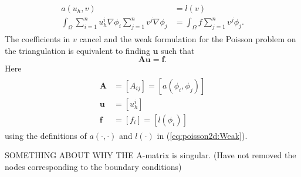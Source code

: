 \documentclass[paper=a4, fontsize=11pt]{scrartcl} %
\begin{document}
\begin{eqnarray}
\begin{aligned}
\nonumber
a(u_h,v) &= l(v) \\
\int_{\Omega}\sum\limits_{i=1}^n u^i_h\nabla\phi_i\sum\limits_{j=1}^n v^j\nabla\phi_j &= \int_{\Omega}f\sum\limits_{j=1}^n v^j\phi_j.
\end{aligned}
\end{eqnarray}
The coefficients in $v$ cancel and the weak formulation for the Poisson problem on the triangulation is equivalent to finding $\mathbf{u}$ such that
\[\mathbf{Au}=\mathbf{f}.\]  
Here
\begin{eqnarray}
\begin{aligned}
\nonumber
\mathbf{A} &= [A_{ij}]=[a(\phi_i,\phi_j)]\\
\mathbf{u} &= [u_{h}^i] \\
\mathbf{f} &= [f_i]=[l(\phi_i)]
\end{aligned}
\end{eqnarray}
using the definitions of $a(\cdot,\cdot)$ and $l(\cdot)$ in (\ref{eq:poisson2d:Weak}).

SOMETHING ABOUT WHY THE A-matrix is singular. (Have not removed the nodes corresponding to the boundary conditions)
\end{document}
